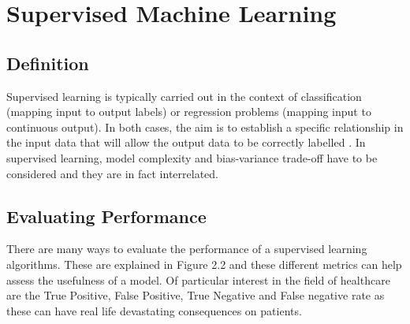 \section{Supervised Machine Learning}
\subsection{Definition}
Supervised learning is typically carried out in the context of classification (mapping input to output labels) or regression problems (mapping input to continuous output). In both cases, the aim is to establish a specific relationship in the input data that will allow the output data to be correctly labelled \citep{Soni:tr}. In supervised learning, model complexity and bias-variance trade-off have to be considered and they are in fact interrelated.
\subsection{Evaluating Performance}

There are many ways to evaluate the performance of a supervised learning algorithms. These are explained in Figure 2.2 and these different metrics can help assess the usefulness of a model. Of particular interest in the field of healthcare are the True Positive, False Positive, True Negative and False negative rate as these can have real life devastating consequences on patients.

